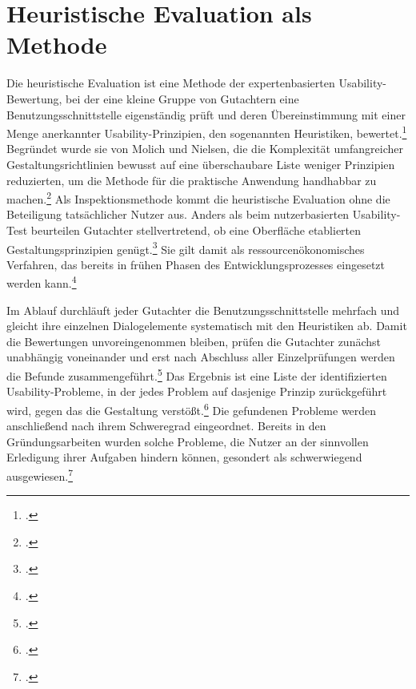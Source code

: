\section{Heuristische Evaluation als Methode}
\label{section:heuristische}

Die heuristische Evaluation ist eine Methode der expertenbasierten Usability-Bewertung,
bei der eine kleine Gruppe von Gutachtern eine Benutzungsschnittstelle eigenständig prüft
und deren Übereinstimmung mit einer Menge anerkannter Usability-Prinzipien, den
sogenannten Heuristiken, bewertet.\footcite[Vgl.][S.~25]{nielsen1994heuristic} Begründet wurde
sie von Molich und Nielsen, die die Komplexität umfangreicher Gestaltungsrichtlinien
bewusst auf eine überschaubare Liste weniger Prinzipien reduzierten, um die Methode für die
praktische Anwendung handhabbar zu machen.\footcite[Vgl.][S. 338]{molich1990improving} Als
Inspektionsmethode kommt die heuristische Evaluation ohne die Beteiligung tatsächlicher
Nutzer aus. Anders als beim nutzerbasierten Usability-Test beurteilen Gutachter
stellvertretend, ob eine Oberfläche etablierten Gestaltungsprinzipien
genügt.\footcite[Vgl.][S. 249]{nielsen1990heuristic} Sie gilt damit als
ressourcenökonomisches Verfahren, das bereits in frühen Phasen des Entwicklungsprozesses
eingesetzt werden kann.\footcite[Vgl.][S. 255]{nielsen1990heuristic}

Im Ablauf durchläuft jeder Gutachter die Benutzungsschnittstelle mehrfach und gleicht ihre
einzelnen Dialogelemente systematisch mit den Heuristiken ab. Damit die Bewertungen
unvoreingenommen bleiben, prüfen die Gutachter zunächst unabhängig voneinander und erst nach
Abschluss aller Einzelprüfungen werden die Befunde
zusammengeführt.\footcite[Vgl.][S.~25]{nielsen1994heuristic} Das Ergebnis ist eine Liste der
identifizierten Usability-Probleme, in der jedes Problem auf dasjenige Prinzip zurückgeführt
wird, gegen das die Gestaltung verstößt.\footcite[Vgl.][S.~25]{nielsen1994heuristic} Die gefundenen
Probleme werden anschließend nach ihrem Schweregrad eingeordnet. Bereits in den
Gründungsarbeiten wurden solche Probleme, die Nutzer an der sinnvollen Erledigung ihrer
Aufgaben hindern können, gesondert als schwerwiegend
ausgewiesen.\footcite[Vgl.][S. 340]{molich1990improving}

